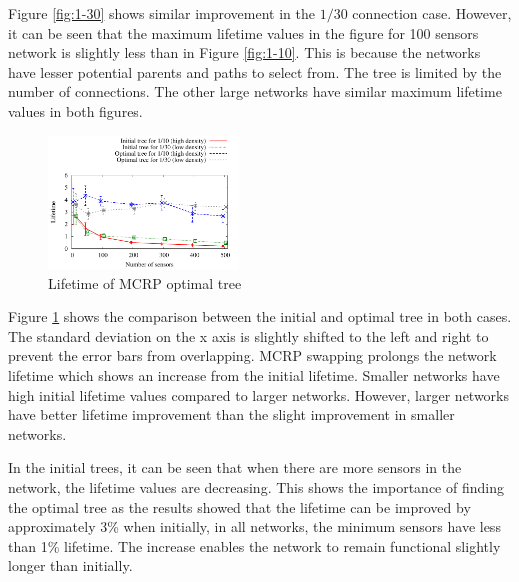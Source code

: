 Figure \ref{fig:1-30} shows similar improvement in the $1/30$ connection case. However, it can be seen that the maximum lifetime values in the figure for 100 sensors network is slightly less than in Figure \ref{fig:1-10}. This is because the networks have lesser potential parents and paths to select from. The tree is limited by the number of connections. The other large networks have similar maximum lifetime values in both figures.

\begin{figure}
\centering
\includegraphics[width=0.45\textwidth]{figures/maxmin.pdf}
\caption{Lifetime of MCRP optimal tree}
\label{fig:nodes-maxmin}
\end{figure}

Figure \ref{fig:nodes-maxmin} shows the comparison between the initial and optimal tree in both cases. The standard deviation on the x axis is slightly shifted to the left and right to prevent the error bars from overlapping. MCRP swapping prolongs the network lifetime which shows an increase from the initial lifetime. Smaller networks have high initial lifetime values compared to larger networks. However, larger networks have better lifetime improvement than the slight improvement in smaller networks.

In the initial trees, it can be seen that when there are more sensors in the network, the lifetime values are decreasing. This shows the importance of finding the optimal tree as the results showed that the lifetime can be improved by approximately 3\% when initially, in all networks, the minimum sensors have less than 1\% lifetime. The increase enables the network to remain functional slightly longer than initially. 
